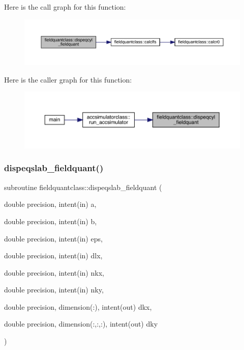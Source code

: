 Here is the call graph for this function\+:\nopagebreak
\begin{figure}[H]
\begin{center}
\leavevmode
\includegraphics[width=350pt]{namespacefieldquantclass_ac9b2b94f5051c235120e16bd55e0148d_cgraph}
\end{center}
\end{figure}
Here is the caller graph for this function\+:\nopagebreak
\begin{figure}[H]
\begin{center}
\leavevmode
\includegraphics[width=350pt]{namespacefieldquantclass_ac9b2b94f5051c235120e16bd55e0148d_icgraph}
\end{center}
\end{figure}
\mbox{\label{namespacefieldquantclass_a362a63ffd1dbce47680a0224d88552c7}} 
\subsubsection{\texorpdfstring{dispeqslab\_fieldquant()}{dispeqslab\_fieldquant()}}
{\footnotesize\ttfamily subroutine fieldquantclass\+::dispeqslab\+\_\+fieldquant (\begin{DoxyParamCaption}\item[{double precision, intent(in)}]{a,  }\item[{double precision, intent(in)}]{b,  }\item[{double precision, intent(in)}]{eps,  }\item[{double precision, intent(in)}]{dlx,  }\item[{double precision, intent(in)}]{nkx,  }\item[{double precision, intent(in)}]{nky,  }\item[{double precision, dimension(\+:), intent(out)}]{dkx,  }\item[{double precision, dimension(\+:,\+:,\+:), intent(out)}]{dky }\end{DoxyParamCaption})}

